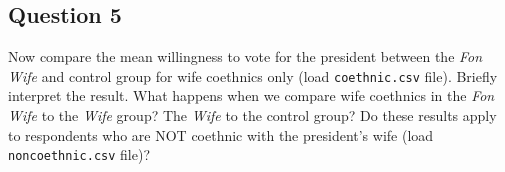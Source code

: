 \documentclass[]{article}
\begin{document}
\subsection{Question 5}\label{question-5}

Now compare the mean willingness to vote for the president between the
\emph{Fon Wife} and control group for wife coethnics only (load
\texttt{coethnic.csv} file). Briefly interpret the result. What happens
when we compare wife coethnics in the \emph{Fon Wife} to the \emph{Wife}
group? The \emph{Wife} to the control group? Do these results apply to
respondents who are NOT coethnic with the president's wife (load
\texttt{noncoethnic.csv} file)?
\end{document}
